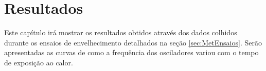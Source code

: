 \chapter{Resultados}
\label{sec:Resultados}

Este capítulo irá mostrar os resultados obtidos através dos dados colhidos durante os ensaios de envelhecimento detalhados na seção \ref{sec:MetEnsaios}. Serão apresentadas as curvas de como a frequência dos osciladores variou com o tempo de exposição ao calor.












